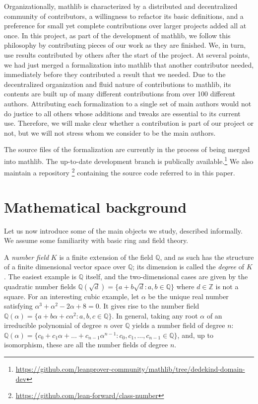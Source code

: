 \documentclass[a4paper,USenglish,cleveref, autoref, thm-restate]{lipics-v2021}
\newcommand{\mathlib}{\textsf{mathlib}\xspace}
\newcommand{\Q}{\mathbb{Q}}
\newcommand{\Z}{\mathbb{Z}}
\begin{document}
Organizationally, \mathlib is characterized by a distributed and decentralized community of contributors, a willingness to refactor its basic definitions, and a preference for small yet complete contributions over larger projects added all at once.
In this project, as part of the development of \mathlib, we follow this philosophy by contributing pieces of our work as they are finished.
We, in turn, use results contributed by others after the start of the project.
At several points, we had just merged a formalization into \mathlib that another contributor needed,
immediately before they contributed a result that we needed.
Due to the decentralized organization and fluid nature of contributions to \mathlib, its contents are built up of many different contributions from over 100 different authors.
Attributing each formalization to a single set of main authors would not do justice to all others whose additions and tweaks are essential to its current use. Therefore, we will make clear whether a contribution is part of our project or not, but we will not stress whom we consider to be the main authors.

The source files of the formalization are currently in the process of being merged into \mathlib.
The up-to-date development branch is publically available.\footnote{\url{https://github.com/leanprover-community/mathlib/tree/dedekind-domain-dev}}
We also maintain a %
repository%
\footnote{\url{https://github.com/lean-forward/class-number}}
containing the source code referred to in this paper.

\section{Mathematical background}\label{sec math background}

Let us now introduce some of the main objects we study, described informally. We assume some familiarity with basic ring and field theory.%

A \emph{number field} $K$ is a finite extension of the field $\Q$, and as such has the structure of a finite dimensional vector space over $\Q$; its dimension is called the \emph{degree} of $K$.
The easiest example is $\Q$ itself, and the two-dimensional cases are given by the quadratic number fields
$\Q(\sqrt{d})=\{a+b\sqrt{d} : a,b \in \Q\}$
where $d \in \Z$ is not a square.
For an interesting cubic example, let $\alpha$ be the unique real number satisfying $\alpha^3 + \alpha^2 - 2\alpha + 8=0$.
It gives rise to the number field
$\Q(\alpha)=\{a+b\alpha+c \alpha^2: a,b,c \in \Q\}$.
In general, taking any root $\alpha$ of an irreducible polynomial of degree $n$ over $\Q$ yields a number field of degree $n$:
$\Q(\alpha)=\{c_0+c_1\alpha+\ldots+c_{n-1} \alpha^{n-1} : c_0,c_1,\ldots,c_{n-1} \in \Q \}$,
and, up to isomorphism, these are all the number fields of degree $n$.
\end{document}
